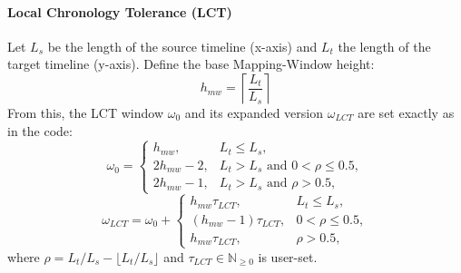 \documentclass[main.tex]{subfiles}
\begin{document}
\paragraph{Local Chronology Tolerance (LCT)}
Let $L_s$ be the length of the source timeline (x-axis) and $L_t$ the length of the target timeline (y-axis). Define the base Mapping-Window height:
\begin{equation}
h_{mw} = \left\lceil \frac{L_t}{L_s} \right\rceil
\end{equation}
From this, the LCT window $\omega_0$ and its expanded version $\omega_{LCT}$ are set exactly as in the code:
\begin{equation}
\omega_0 = \begin{cases}
h_{mw}, & L_t \leq L_s, \\
2h_{mw} - 2, & L_t > L_s \text{ and } 0 < \rho \leq 0.5, \\
2h_{mw} - 1, & L_t > L_s \text{ and } \rho > 0.5,
\end{cases}
\end{equation}
\begin{equation}
\omega_{LCT} = \omega_0 + \begin{cases}
h_{mw} \tau_{LCT}, & L_t \leq L_s, \\
(h_{mw} - 1) \tau_{LCT}, & 0 < \rho \leq 0.5, \\
h_{mw} \tau_{LCT}, & \rho > 0.5,
\end{cases}
\end{equation}
where $\rho = L_t/L_s - \lfloor L_t/L_s \rfloor$ and $\tau_{LCT} \in \mathbb{N}_{\geq 0}$ is user-set.
\end{document}
